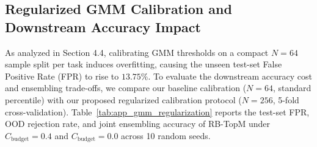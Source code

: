 \documentclass{article}
\theoremstyle{plain}
\theoremstyle{definition}
\theoremstyle{remark}
\begin{document}
\subsection{Regularized GMM Calibration and Downstream Accuracy Impact}
As analyzed in Section 4.4, calibrating GMM thresholds on a compact $N=64$ sample split per task induces overfitting, causing the unseen test-set False Positive Rate (FPR) to rise to $13.75\%$. To evaluate the downstream accuracy cost and ensembling trade-offs, we compare our baseline calibration ($N=64$, standard percentile) with our proposed regularized calibration protocol ($N=256$, 5-fold cross-validation). Table~\ref{tab:app_gmm_regularization} reports the test-set FPR, OOD rejection rate, and joint ensembling accuracy of RB-TopM under $C_{\text{budget}} = 0.4$ and $C_{\text{budget}} = 0.0$ across 10 random seeds.

\begin{table}[h]
\caption{\textbf{Baseline vs. Regularized Gaussian Mixture Model (GMM) Calibration Trade-offs in Resource-Budgeted Top-$M$ Expert Serving (RB-TopM).} We compare our baseline unregularized GMM calibration ($N=64$, standard percentile) used in our appendix sensitivity sweeps (Tables~\ref{tab:app_temperature_sweep}, \ref{tab:app_thetamax_sweep}, and \ref{tab:app_scaling_sweep}) against our default regularized calibration protocol ($N=256$, 5-fold Cross-Validation) used for our main Table~\ref{tab:main_results} results. Note that the unregularized baseline exhibits a test-set False Positive Rate (FPR) of 13.75\% resulting in 0.86 active experts under low budgets, whereas the regularized CV protocol restricts test-set FPR to a highly stable 5.26\% (yielding 0.95 active experts), fully correcting the GMM generalization gap.}
\label{tab:app_gmm_regularization}
\vskip 0.1in
\begin{center}
\begin{small}
\begin{sc}
\end{sc}
\end{small}
\end{center}
\vskip -0.1in
\end{table}
\end{document}
